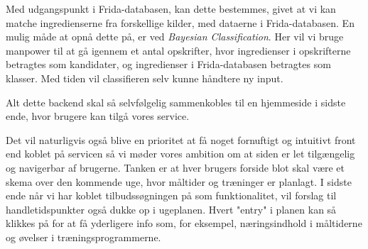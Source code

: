 \documentclass[a4paper,]{article}
\begin{document}
Med udgangspunkt i Frida-databasen, kan dette bestemmes, givet at vi
kan matche ingredienserne fra forskellige kilder, med dataerne i
Frida-databasen.  En mulig måde at opnå dette på, er ved
\textit{Bayesian Classification}.  Her vil vi bruge manpower til at gå
igennem et antal opskrifter, hvor ingredienser i opskrifterne
betragtes som kandidater, og ingredienser i Frida-databasen betragtes
som klasser.  Med tiden vil classifieren selv kunne håndtere ny input.

Alt dette backend skal så selvfølgelig sammenkobles til en hjemmeside i sidste ende, hvor brugere kan tilgå vores service.

Det vil naturligvis også blive en prioritet at få noget fornuftigt og intuitivt front end koblet på servicen så vi møder vores ambition om at siden er let tilgængelig og navigerbar af brugerne. Tanken er at hver brugers forside blot skal være et skema over den kommende uge, hvor måltider og træninger er planlagt. I sidste ende når vi har koblet tilbudssøgningen på som funktionalitet, vil forslag til handletidspunkter også dukke op i ugeplanen. Hvert "entry" i planen kan så klikkes på for at få yderligere info som, for eksempel, næringsindhold i måltiderne og øvelser i træningsprogrammerne.
\end{document}
